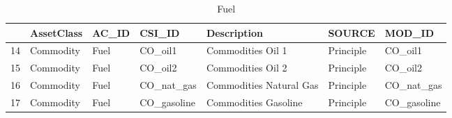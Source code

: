 \begin{longtable}{rllllll}
\caption{Fuel} \\ 
  \hline
 & AssetClass & AC\_ID & CSI\_ID & Description & SOURCE & MOD\_ID \\ 
  \hline
14 & Commodity & Fuel & CO\_oil1 & Commodities Oil 1 & Principle & CO\_oil1 \\ 
  15 & Commodity & Fuel & CO\_oil2 & Commodities Oil 2 & Principle & CO\_oil2 \\ 
  16 & Commodity & Fuel & CO\_nat\_gas & Commodities Natural Gas & Principle & CO\_nat\_gas \\ 
  17 & Commodity & Fuel & CO\_gasoline & Commodities Gasoline & Principle & CO\_gasoline \\ 
   \hline
\hline
\end{longtable}

